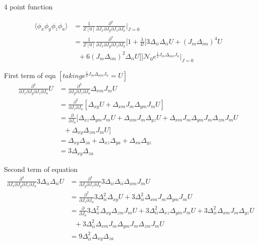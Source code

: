 \documentclass[12pt, letterpaper]{article}
\author{Noor E Mustafa Ferdous}
\title{}
\date{}
\newcommand*{\1}{\hspace{1pt}}
\begin{document}
    4 point function 

    \begin{equation}
    \begin{split}
        \langle \phi_{x}\phi_{y}\phi_{z}\phi_{a} \rangle & = \frac{1}{Z[0]}\frac{\partial ^{4}}{{\partial J_{x}\partial J_{y}\partial J_{z}\partial J_{a}}}\Biggr|_{J=0} \\
        & =\frac{1}{Z[0]}\frac{\partial ^{4}}{{\partial J_{x}\partial J_{y}\partial J_{z}\partial J_{a}}} [1+\frac{\lambda}{4!}[3\Delta_{ii}\Delta_{ii}U + (J_{m}\Delta_{im})^{4} U \\
        & \ \ \  + 6(J_{m}\Delta_{im})^{2}\Delta_{ii} U]]\mathcal{N}_{0} e^{\frac{1}{2} J_{m} \Delta _{mn} J_{n}}\Biggr|_{J=0}
    \end{split}
    \end{equation}

    First term of eqn $[taking e^{\frac{1}{2} J_{m} \Delta _{mn} J_{n}} = U]$
    \begin{align*}
        \frac{\partial ^{4}}{\partial J_{x}\partial J_{y}\partial J_{z} \partial J_{a}}U & =\frac{\partial ^{3}}{{\partial J_{y}\partial J_{z}\partial J_{a}}} \Delta_{xm}J_{m}U \\
         & = \frac{\partial ^{2}}{\partial J_{z}\partial J_{a}}[\Delta_{xy}U + \Delta_{xm}J_{m}\Delta_{ym}J_{m}U] \\ 
         & = \frac{\partial}{\partial J_{a}}[\Delta_{xz}\Delta_{ym}J_{m}U + \Delta_{xm}J_{m}\Delta_{yz}U + \Delta_{xm}J_{m}\Delta_{ym}J_{m}\Delta_{zm}J_{m}U \\ 
         & \ \ \  + \Delta_{xy}\Delta_{zm}J_{m}U] \\ 
         & = \Delta_{xy}\Delta_{za} + \Delta_{xz}\Delta_{ya} + \Delta_{xa}\Delta_{yz} \tag*{putting J=0} \\ 
         & = 3 \Delta_{xy}\Delta_{za}
    \end{align*}

    Second term of equation 
    \begin{align*}
        \frac{\partial ^{4}}{{\partial J_{x}\partial J_{y}\partial J_{z}\partial J_{a}}}3\Delta_{ii}\Delta_{ii}U & = \frac{\partial ^{3}}{{\partial J_{y}\partial J_{z}\partial J_{a}}} 3\Delta_{ii}\Delta_{ii}\Delta_{xm}J_{m}U \\ 
        & =\frac{\partial ^{2}}{\partial J_{z}\partial J_{a}} 3\Delta_{ii}^{2}\Delta_{xy}U + 3\Delta_{ii}^{2}\Delta_{xm}J_{m}\Delta_{ym}J_{m}U \\
        & = \frac{\partial}{\partial J_{a}}3\Delta_{ii}^{2}\Delta_{xy}\Delta_{zm}J_{m}U + 3\Delta_{ii}^{2}\Delta_{xz}\Delta_{ym}J_{m}U + 3\Delta_{ii}^{2}\Delta_{xm}J_{m}\Delta_{yz}U \\ 
        & \ \ \ + 3\Delta_{ii}^{2}\Delta_{xm}J_{m}\Delta_{ym}J_{m}\Delta_{zm}J_{m}U \\ 
        & = 9\Delta_{ii}^{2}\Delta_{xy}\Delta_{za}
    \end{align*}
\end{document}
